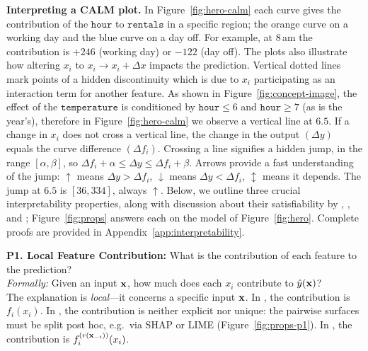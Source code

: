 \textbf{Interpreting a CALM plot.}
In Figure~\ref{fig:hero-calm} each curve gives the contribution of the $\mathtt{hour}$ to $\mathtt{rentals}$ in a specific region;
the orange curve on a working day and the blue curve on a day off.
For example, at 8\,am the contribution is $+246$ (working day) or $-122$ (day off).
The plots also illustrate how altering \( x_i \) to \(x_i \rightarrow x_i + \Delta x \) impacts the prediction.
Vertical dotted lines mark points of a hidden discontinuity which is due to $x_i$ participating as an interaction term for another feature. As shown in Figure~\ref{fig:concept-image}, the effect of the $\mathtt{temperature}$ is conditioned by $\mathtt{hour} \leq 6$ and $\mathtt{hour} \geq 7$ (as is the year's), therefore in Figure~\ref{fig:hero-calm} we observe a vertical line at $6.5$.
If a change in $x_i$ does not cross a vertical line, the change in the output \( (\Delta y) \) equals the curve difference \( (\Delta f_i )\).
Crossing a line signifies a hidden jump, in the range $[\alpha, \beta]$, so 
$ \Delta f_i + \alpha \leq \Delta y \leq \Delta f_i + \beta$.
Arrows provide a fast understanding of the jump:
\(\uparrow\) means $\Delta y > \Delta f_i$,
\(\downarrow\) means $\Delta y < \Delta f_i$,
\(\updownarrow\) means it depends.
The jump at $6.5$ is $[36, 334]$, always \(\uparrow\).
Below, we outline three crucial interpretability properties, along with discussion about their satisfiability by \gam, \gamm, and \method; Figure~\ref{fig:props} answers each on the model of Figure~\ref{fig:hero}. Complete proofs are provided in Appendix~\ref{app:interpretability}.



\textbf{P1. Local Feature Contribution:} What is the contribution of each feature to the prediction?\\
\textit{Formally:} Given an input $\mathbf{x}$, how much does each $x_i$ contribute to $\hat y(\mathbf{x})$?\\
The explanation is \emph{local}—it concerns a specific input $\mathbf{x}$.
In \gam, the contribution is \( f_i(x_i) \).
In \gamm, the contribution is neither explicit nor unique: the pairwise surfaces must be split post hoc, e.g.\ via SHAP or LIME (Figure~\ref{fig:props-p1}).
In \method, the contribution is \( f_i^{(r(\mathbf{x}_{-i}))}(x_i) \).

